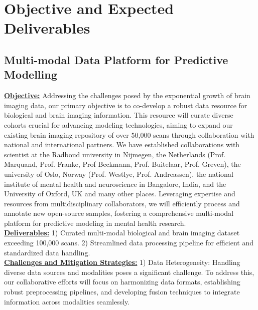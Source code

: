 \section{Objective and Expected Deliverables}\label{sec:research_plan}

\subsection{Multi-modal Data Platform for Predictive Modelling}\label{ssec:platform}
\textbf{\underline{Objective:}} Addressing the challenges posed by the exponential growth of brain imaging data, our primary objective is to co-develop a robust data resource for biological and brain imaging information. This resource will curate diverse cohorts crucial for advancing modeling technologies, aiming to expand our existing brain imaging repository of over 50,000 scans through collaboration with national and international partners. We have established collaborations with scientist at the Radboud university in Nijmegen, the Netherlands (Prof. Marquand, Prof. Franke, Prof Beckmann, Prof. Buitelaar, Prof. Greven), the university of Oslo, Norway (Prof. Westlye, Prof. Andreassen), the national institute of mental health and neuroscience in Bangalore, India, and the University of Oxford, UK and many other places. Leveraging expertise and resources from multidisciplinary collaborators, we will efficiently process and annotate new open-source samples, fostering a comprehensive multi-modal platform for predictive modeling in mental health research.
\noindent\\
\textbf{\underline{Deliverables:}}
1) Curated multi-modal biological and brain imaging dataset exceeding 100,000 scans.
2) Streamlined data processing pipeline for efficient and standardized data handling.
\noindent\\
\textbf{\underline{Challenges and Mitigation Strategies:}}
1) Data Heterogeneity: Handling diverse data sources and modalities poses a significant challenge. To address this, our collaborative efforts will focus on harmonizing data formats, establishing robust preprocessing pipelines, and developing fusion techniques to integrate information across modalities seamlessly.


